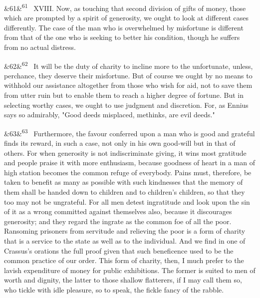 \documentclass[12pt]{article}
\newcommand{\para}[1][]{\par\noindent\ifx&#1&\else\textsuperscript{\footnotesize #1}~\fi}
\begin{document}
\para[61] XVIII. Now, as touching that second division of gifts of money, those which are prompted by a spirit of generosity, we ought to look at different cases differently. The case of the man who is overwhelmed by misfortune is different from that of the one who is seeking to better his condition, though he suffers from no actual distress.

\para[62] It will be the duty of charity to incline more to the unfortunate, unless, perchance, they deserve their misfortune. But of course we ought by no means to withhold our assistance altogether from those who wish for aid, not to save them from utter ruin but to enable them to reach a higher degree of fortune. But in selecting worthy cases, we ought to use judgment and discretion. For, as Ennius says so admirably, "Good deeds misplaced, methinks, are evil deeds."

\para[63] Furthermore, the favour conferred upon a man who is good and grateful finds its reward, in such a case, not only in his own good-will but in that of others. For when generosity is not indiscriminate giving, it wins most gratitude and people praise it with more enthusiasm, because goodness of heart in a man of high station becomes the common refuge of everybody. Pains must, therefore, be taken to benefit as many as possible with such kindnesses that the memory of them shall be handed down to children and to children's children, so that they too may not be ungrateful. For all men detest ingratitude and look upon the sin of it as a wrong committed against themselves also, because it discourages generosity; and they regard the ingrate as the common foe of all the poor. Ransoming prisoners from servitude and relieving the poor is a form of charity that is a service to the state as well as to the individual. And we find in one of Crassus's orations the full proof given that such beneficence used to be the common practice of our order. This form of charity, then, I much prefer to the lavish expenditure of money for public exhibitions. The former is suited to men of worth and dignity, the latter to those shallow flatterers, if I may call them so, who tickle with idle pleasure, so to speak, the fickle fancy of the rabble.
\end{document}
